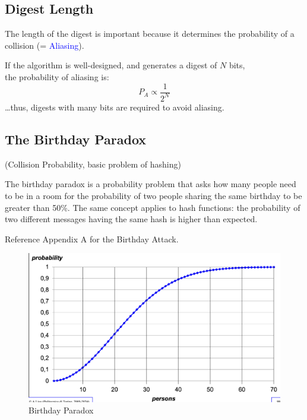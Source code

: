 \subsection{Digest Length}
The length of the digest is important because it determines the probability of a collision \newline (= \textcolor{Blue}{Aliasing}). 

If the algorithm is well-designed, and generates a digest of $N$ bits, \\ the probability of aliasing is:
\[
    P_A \propto \frac{1}{2^{N}}
\]
\dots thus, digests with many bits are required to avoid aliasing.

\subsection{The Birthday Paradox}
\begin{center}
    (Collision Probability, basic problem of hashing)
\end{center}

\begin{multicols}{2}
    The birthday paradox is a probability problem that asks how many people need to be in a room for the probability of two people sharing the same birthday to be greater than 50\%. The same concept applies to hash functions: the probability of two different messages having the same hash is higher than expected.

    \vspace{0.5cm}

    \begin{center}
        Reference Appendix A for the Birthday Attack.
    \end{center}

\columnbreak

    \begin{figure}[H]
        \centering
        \includegraphics[width=\linewidth]{Images/Cryptography/bd_paradox.png}
        \caption{Birthday Paradox}
    \end{figure}
\end{multicols}



